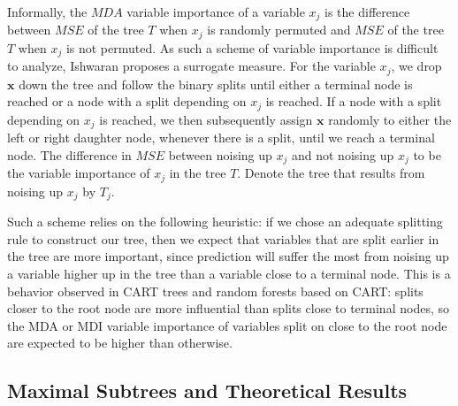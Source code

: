 \documentclass[12pt,twoside]{reedthesis}
\theoremstyle{definition}
\theoremstyle{definition}
\theoremstyle{definition}
\theoremstyle{remark}
\begin{document}
Informally, the \(MDA\) variable importance of a variable \(x_j\) is the
difference between \(MSE\) of the tree \(T\) when \(x_j\) is randomly
permuted and \(MSE\) of the tree \(T\) when \(x_j\) is not permuted. As
such a scheme of variable importance is difficult to analyze, Ishwaran
proposes a surrogate measure. For the variable \(x_j\), we drop
\(\mathbf{x}\) down the tree and follow the binary splits until either a
terminal node is reached or a node with a split depending on \(x_j\) is
reached. If a node with a split depending on \(x_j\) is reached, we then
subsequently assign \(\mathbf{x}\) randomly to either the left or right
daughter node, whenever there is a split, until we reach a terminal
node. The difference in \(MSE\) between noising up \(x_j\) and not
noising up \(x_j\) to be the variable importance of \(x_j\) in the tree
\(T\). Denote the tree that results from noising up \(x_j\) by \(T_j\).
\par

Such a scheme relies on the following heuristic: if we chose an adequate
splitting rule to construct our tree, then we expect that variables that
are split earlier in the tree are more important, since prediction will
suffer the most from noising up a variable higher up in the tree than a
variable close to a terminal node. This is a behavior observed in CART
trees and random forests based on CART: splits closer to the root node
are more influential than splits close to terminal nodes, so the MDA or
MDI variable importance of variables split on close to the root node are
expected to be higher than otherwise. \par

\subsection{Maximal Subtrees and Theoretical
Results}\label{maximal-subtrees-and-theoretical-results}
\end{document}

